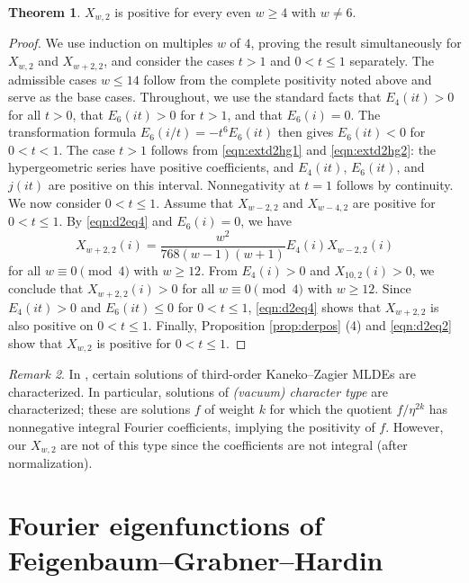 \documentclass[10pt,reqno]{amsproc}
\newcommand{\1}{\mathds{1}}	%
\theoremstyle{definition}
\newtheorem{theorem}{Theorem}[section]
\theoremstyle{remark}
\newtheorem{remark}[theorem]{Remark}
\begin{document}
\begin{theorem}
\label{thm:kkd2weak}
$X_{w, 2}$ is positive for every even $w \geq 4$ with $w \neq 6$.
\end{theorem}
\begin{proof}
We use induction on multiples $w$ of $4$, proving the result simultaneously for $X_{w,2}$ and $X_{w+2,2}$, and consider the cases $t > 1$ and $0 < t \le 1$ separately.
The admissible cases $w \leq 14$ follow from the complete positivity noted above and serve as the base cases.
Throughout, we use the standard facts that $E_4(it) > 0$ for all $t > 0$, that $E_6(it) > 0$ for $t > 1$, and that $E_6(i) = 0$. The transformation formula $E_6(i/t)=-t^6E_6(it)$ then gives $E_6(it)<0$ for $0<t<1$.
The case $t>1$ follows from \eqref{eqn:extd2hg1} and \eqref{eqn:extd2hg2}: the hypergeometric series have positive coefficients, and $E_4(it)$, $E_6(it)$, and $j(it)$ are positive on this interval.
Nonnegativity at $t=1$ follows by continuity.
We now consider $0 < t \le 1$.
Assume that $X_{w-2, 2}$ and $X_{w-4, 2}$ are positive for $0 < t \le 1$.
By \eqref{eqn:d2eq4} and $E_6(i) = 0$, we have
\[
    X_{w+2,2}(i) = \frac{w^2}{768(w-1)(w+1)} E_4(i) X_{w-2,2}(i)
\]
for all $w \equiv 0 \pmod{4}$ with $w \geq 12$.
From $E_4(i) > 0$ and $X_{10,2}(i) > 0$, we conclude that $X_{w+2,2}(i) > 0$ for all $w \equiv 0 \pmod{4}$ with $w \geq 12$.
Since $E_4(it) > 0$ and $E_6(it) \le 0$ for $0 < t \le 1$, \eqref{eqn:d2eq4} shows that $X_{w + 2, 2}$ is also positive on $0 < t \le 1$.
Finally, Proposition \ref{prop:derpos} (4) and \eqref{eqn:d2eq2} show that $X_{w, 2}$ is positive for $0 < t \le 1$.
\end{proof}


\begin{remark}
In \cite{kaneko2017third}, certain solutions of third-order Kaneko--Zagier MLDEs \cite{kaneko1998supersingular} are characterized.
In particular, solutions of \emph{(vacuum) character type} are characterized; these are solutions $f$ of weight $k$ for which the quotient $f / \eta^{2k}$ has nonnegative integral Fourier coefficients, implying the positivity of $f$.
However, our $X_{w, 2}$ are not of this type since the coefficients are not integral (after normalization).
\end{remark}

\section{Fourier eigenfunctions of Feigenbaum--Grabner--Hardin}
\end{document}
